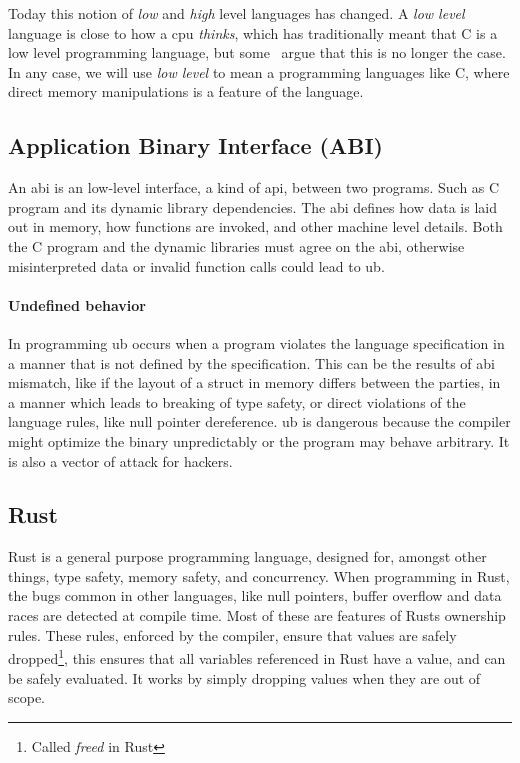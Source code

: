 Today this notion of \textit{low} and \textit{high} level languages has changed.
A \textit{low level} language is close to how a \gls*{cpu} \textit{thinks},
which has traditionally meant that C is a low level programming language, but
some~\cite{cNotLowLevel} argue that this is no longer the case. In any case, we
will use \textit{low level} to mean a programming languages like C, where direct
memory manipulations is a feature of the language.

\subsection{Application Binary Interface (ABI)}

An \gls*{abi} is an low-level interface, a kind of \gls*{api},
between two programs. Such as C program and its dynamic library dependencies.
The \gls*{abi} defines how data is laid out in memory, how functions are
invoked, and other machine level details. Both the C program and the dynamic
libraries must agree on the \gls*{abi}, otherwise misinterpreted data or invalid
function calls could lead to \gls*{ub}.

\paragraph{Undefined behavior} In programming \gls*{ub} occurs when a program
violates the language specification in a manner that is not defined by the
specification. This can be the results of \gls*{abi} mismatch, like if the
layout of a struct in memory differs between the parties, in a manner which
leads to breaking of type safety, or direct violations of the language rules,
like null pointer dereference. \gls*{ub} is dangerous because the compiler might
optimize the binary unpredictably or the program may behave arbitrary. It is
also a vector of attack for hackers.


\subsection{Rust}

Rust is a general purpose programming language, designed for, amongst other
things, type safety, memory safety, and concurrency. When programming in Rust,
the bugs common in other languages, like null pointers, buffer overflow and data
races are detected at compile time. Most of these are features of Rusts
ownership rules. These rules, enforced by the compiler, ensure that values are
safely dropped\footnote{Called \textit{freed} in Rust}, this ensures that all
variables referenced in Rust have a value, and can be safely evaluated. It works
by simply dropping values when they are out of scope.

